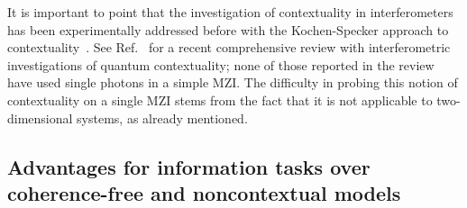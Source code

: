 \documentclass[a4paper,twocolumn,11pt,accepted=2024-01-17]{quantumarticle}
\begin{document}
It is important to point that the investigation of contextuality in interferometers has been experimentally addressed before with the Kochen-Specker approach to contextuality~\cite{borges2014quantum,liu2009experimental}. See Ref.~\cite{Budroni21} for a recent comprehensive review with interferometric investigations of quantum contextuality; none of those reported in the review have used single photons in a simple MZI. The difficulty in probing this notion of contextuality on a single MZI stems from the fact that it is not applicable to two-dimensional systems, as already mentioned. 

\subsection{Advantages for information tasks over coherence-free and noncontextual models}\label{subsec: Generic advantages}
\end{document}
